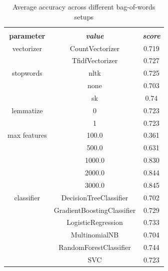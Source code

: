\documentclass[conference]{IEEEtran}
\begin{document}
\begin{table}[htbp]
\caption{Average accuracy across different bag-of-words setups}
\begin{center}
\begin{tabular}{|c|c|c|}
\hline
\textbf{}&\multicolumn{2}{|c|}{\textbf{}} \\ 
\cline{2-3}
\textbf{parameter} & \textbf{\textit{value}}& \textbf{\textit{score}} \\ 
\hline
vectorizer & CountVectorizer & 0.719 \\ 
\cline{2-3}
 & TfidfVectorizer & 0.727 \\ 
\hline
stopwords & nltk & 0.725 \\ 
\cline{2-3}
 & none & 0.703 \\ 
\cline{2-3}
 & sk & 0.74 \\ 
\hline
lemmatize & 0 & 0.723 \\ 
\cline{2-3}
 & 1 & 0.723 \\ 
\hline
max features & 100.0 & 0.361 \\ 
\cline{2-3}
 & 500.0 & 0.631 \\ 
\cline{2-3}
 & 1000.0 & 0.830 \\ 
\cline{2-3}
 & 2000.0 & 0.844 \\ 
\cline{2-3}
 & 3000.0 & 0.845 \\ 
\hline
classifier & DecisionTreeClassifier & 0.702 \\ 
\cline{2-3}
 & GradientBoostingClassifier & 0.729 \\ 
\cline{2-3}
 & LogisticRegression & 0.733 \\ 
\cline{2-3}
 & MultinomialNB & 0.704 \\ 
\cline{2-3}
 & RandomForestClassifier & 0.744 \\ 
\cline{2-3}
 & SVC & 0.723 \\ 
\hline
\end{tabular}
\label{tab5}
\end{center}
\end{table}
\end{document}
